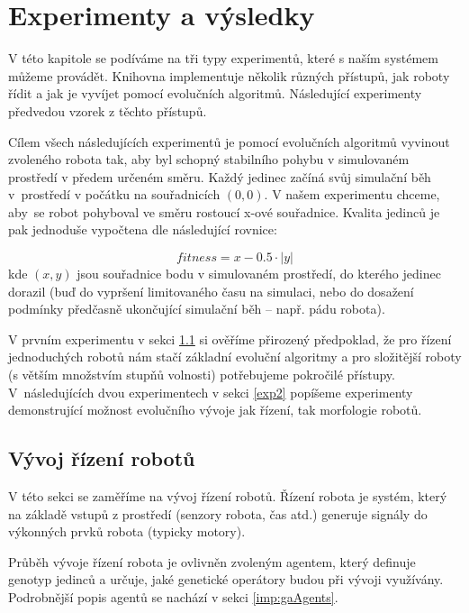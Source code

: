 \chapter{Experimenty a výsledky} \label{chapter-experimenty}

V této kapitole se podíváme na tři typy experimentů, které s naším systémem
můžeme provádět. Knihovna implementuje několik různých přístupů, jak roboty
řídit a jak je vyvíjet pomocí evolučních algoritmů. Následující experimenty
předvedou vzorek z těchto přístupů. 

Cílem všech následujících experimentů je pomocí evolučních algoritmů vyvinout
zvoleného robota tak, aby byl schopný stabilního pohybu v simulovaném prostředí
v předem určeném směru. Každý jedinec začíná svůj simulační běh v~prostředí v
počátku na souřadnicích $(0,0)$. V našem experimentu chceme, aby~se robot
pohyboval ve směru rostoucí x-ové souřadnice. Kvalita jedinců je pak jednoduše
vypočtena dle následující rovnice:

\begin{equation} \label{fitness_calc}
    fitness = x - 0.5\cdot|y|
\end{equation}
kde $(x,y)$ jsou souřadnice bodu v simulovaném prostředí, do kterého jedinec
dorazil (buď do vypršení limitovaného času na simulaci, nebo do dosažení
podmínky předčasně ukončující simulační běh -- např. pádu robota).

V prvním experimentu v sekci \ref{exp1} si ověříme přirozený předpoklad, že pro
řízení jednoduchých robotů nám stačí základní evoluční algoritmy a pro
složitější roboty (s větším množstvím stupňů volnosti) potřebujeme pokročilé
přístupy. V~následujících dvou experimentech v sekci \ref{exp2} popíšeme
experimenty demonstrující možnost evolučního vývoje jak řízení, tak morfologie
robotů.

\section{Vývoj řízení robotů} \label{exp1}

V této sekci se zaměříme na vývoj řízení robotů. Řízení robota je systém,
který na základě vstupů z prostředí (senzory robota, čas atd.) generuje
signály do výkonných prvků robota (typicky motory). 

Průběh vývoje řízení robota je ovlivněn zvoleným agentem, který definuje
genotyp jedinců a určuje, jaké genetické operátory budou při vývoji využívány.
Podrobnější popis agentů se nachází v sekci \ref{imp:gaAgents}.

